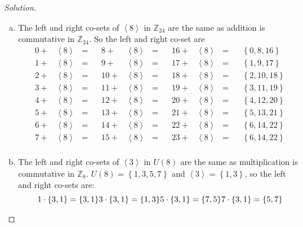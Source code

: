\documentclass{article}
\theoremstyle{definition}
\theoremstyle{remark}
\newcommand{\Z}{\mathbb{Z}}
\begin{document}
	\begin{proof}[Solution]\hfill
		\begin{enumerate}[(a)]
			\item The left and right co-sets of $\left\langle8\right\rangle$ in $\Z_{24}$ are the same as addition is commutative in $\Z_{24}$. So the left and right co-set are 
			\begin{align*}
			0+&\left\langle8\right\rangle	& =&	&	8+&\left\langle8\right\rangle	&=&&	16+&\left\langle8\right\rangle	&=&	&	\left\{0,8,16\right\}\\
			1+&\left\langle8\right\rangle	&=&	&	9+&\left\langle8\right\rangle	&=&	&	17+&\left\langle8\right\rangle	&=&	&	\left\{1,9,17\right\}\\
			2+&\left\langle8\right\rangle	&=&	&	10+&\left\langle8\right\rangle	&=&	&	18+&\left\langle8\right\rangle	&=&	&	\left\{2,10,18\right\}\\
			3+&\left\langle8\right\rangle	&=&	&	11+&\left\langle8\right\rangle	&=&	&	19+&\left\langle8\right\rangle	&=&	&	\left\{3,11,19\right\}\\
			4+&\left\langle8\right\rangle	&=&	&	12+&\left\langle8\right\rangle	&=&	&	20+&\left\langle8\right\rangle	&=&	&	\left\{4,12,20\right\}\\
			5+&\left\langle8\right\rangle	&=&	&	13+&\left\langle8\right\rangle	&=&	&	21+&\left\langle8\right\rangle	&=&	&	\left\{5,13,21\right\}\\
			6+&\left\langle8\right\rangle	&=&	&	14+&\left\langle8\right\rangle	&=&	&	22+&\left\langle8\right\rangle	&=&	&	\left\{6,14,22\right\}\\
			7+&\left\langle8\right\rangle	&=&	&	15+&\left\langle8\right\rangle	&=&	&	23+&\left\langle8\right\rangle	&=&	&	\left\{6,14,22\right\}\\
			\end{align*}
			\item The left and right co-sets of $\left\langle3\right\rangle$ in $U(8)$ are the same as multiplication is commutative in $\Z_8$. $U(8)=\left\{1,3,5,7\right\}$ and $\left\langle3\right\rangle=\left\{1,3\right\}$, so the left and right co-sets are:
			\begin{dmath*}
				{1\cdot\left\{3,1\right\}=\left\{3,1\right\}}\\
				{3\cdot\left\{3,1\right\}=\left\{1,3\right\}}\\
				{5\cdot\left\{3,1\right\}=\left\{7,5\right\}}\\
				{7\cdot\left\{3,1\right\}=\left\{5,7\right\}}\\
			\end{dmath*}

\end{enumerate}
\end{proof}
\end{document}
